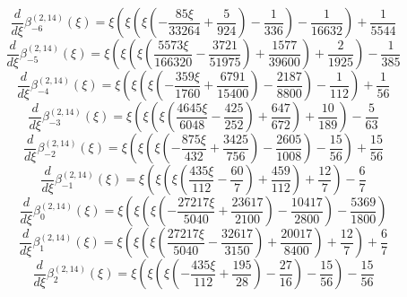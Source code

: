 \begin{equation}
\frac{d}{d\xi}\beta_{-6}^{(2,14)} (\xi) =
 \xi \left(\xi \left(\xi \left(- \frac{85 \xi}{33264}
 + \frac{5}{924}\right) - \frac{1}{336}\right) - \frac{1}{16632}\right) + \frac{1}{5544}
\end{equation}
\begin{equation}
\frac{d}{d\xi}\beta_{-5}^{(2,14)} (\xi) =
 \xi \left(\xi \left(\xi \left(\frac{5573 \xi}{166320}
 - \frac{3721}{51975}\right) + \frac{1577}{39600}\right) + \frac{2}{1925}\right) - \frac{1}{385}
\end{equation}
\begin{equation}
\frac{d}{d\xi}\beta_{-4}^{(2,14)} (\xi) =
 \xi \left(\xi \left(\xi \left(- \frac{359 \xi}{1760}
 + \frac{6791}{15400}\right) - \frac{2187}{8800}\right) - \frac{1}{112}\right) + \frac{1}{56}
\end{equation}
\begin{equation}
\frac{d}{d\xi}\beta_{-3}^{(2,14)} (\xi) =
 \xi \left(\xi \left(\xi \left(\frac{4645 \xi}{6048}
 - \frac{425}{252}\right) + \frac{647}{672}\right) + \frac{10}{189}\right) - \frac{5}{63}
\end{equation}
\begin{equation}
\frac{d}{d\xi}\beta_{-2}^{(2,14)} (\xi) =
 \xi \left(\xi \left(\xi \left(- \frac{875 \xi}{432}
 + \frac{3425}{756}\right) - \frac{2605}{1008}\right) - \frac{15}{56}\right) + \frac{15}{56}
\end{equation}
\begin{equation}
\frac{d}{d\xi}\beta_{-1}^{(2,14)} (\xi) =
 \xi \left(\xi \left(\xi \left(\frac{435 \xi}{112}
 - \frac{60}{7}\right) + \frac{459}{112}\right) + \frac{12}{7}\right) - \frac{6}{7}
\end{equation}
\begin{equation}
\frac{d}{d\xi}\beta_{0}^{(2,14)} (\xi) =
 \xi \left(\xi \left(\xi \left(- \frac{27217 \xi}{5040}
 + \frac{23617}{2100}\right) - \frac{10417}{2800}\right) - \frac{5369}{1800}\right)
\end{equation}
\begin{equation}
\frac{d}{d\xi}\beta_{1}^{(2,14)} (\xi) =
 \xi \left(\xi \left(\xi \left(\frac{27217 \xi}{5040}
 - \frac{32617}{3150}\right) + \frac{20017}{8400}\right) + \frac{12}{7}\right) + \frac{6}{7}
\end{equation}
\begin{equation}
\frac{d}{d\xi}\beta_{2}^{(2,14)} (\xi) =
 \xi \left(\xi \left(\xi \left(- \frac{435 \xi}{112}
 + \frac{195}{28}\right) - \frac{27}{16}\right) - \frac{15}{56}\right) - \frac{15}{56}
\end{equation}
